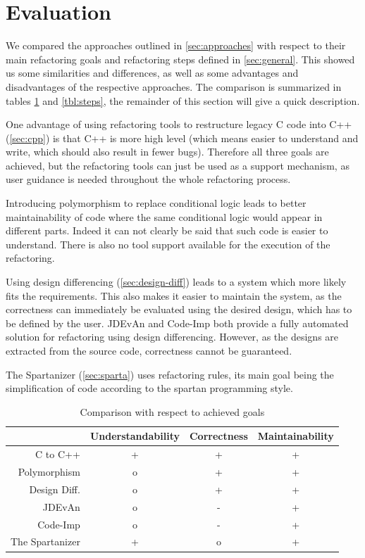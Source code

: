 \documentclass[conference,compsoc,a4paper]{IEEEtran}
\newcommand{\JDEvAn}{\mbox{JDEvAn}\xspace}
\begin{document}
\section{Evaluation}

We compared the approaches outlined in \autoref{sec:approaches} with respect to their main refactoring goals and 
refactoring steps defined in \autoref{sec:general}. This showed us some similarities and differences, as well as some 
advantages and disadvantages of the respective approaches. The comparison is summarized in tables \ref{tbl:goals} and 
\ref{tbl:steps}, the remainder of this section will give a quick description.

One advantage of using refactoring tools to restructure legacy C code into C++ (\autoref{sec:cpp}) is that C++ is more 
high level (which means easier to understand and write, which should also result in fewer bugs). Therefore all three 
goals are achieved, but the refactoring tools can just be used as a support mechanism, as user guidance is needed 
throughout the whole refactoring process.

Introducing polymorphism to replace conditional logic leads to better maintainability of code where the same 
conditional logic would appear in different parts. Indeed it can not clearly be said that such code is easier to 
understand. There is also no tool support available for the execution of the refactoring.

Using design differencing (\autoref{sec:design-diff}) leads to a system which more likely fits the requirements. This 
also makes it easier to maintain the system, as the correctness can immediately be evaluated using the desired design, 
which has to be defined by the user.
\JDEvAn and Code-Imp both provide a fully automated solution for 
refactoring using design differencing. However, as the designs are extracted from the source code, correctness cannot 
be guaranteed.

The Spartanizer (\autoref{sec:sparta}) uses refactoring rules, its main goal being the simplification of code according 
to the spartan programming style.

\begin{table}[htb]
  \centering
  \caption{Comparison with respect to achieved goals}
  \label{tbl:goals}
  \begin{tabular}{r|ccc}
    ~               & Understandability & Correctness & Maintainability \\ \hline
    C to C++        & +                 & +           & + \\
    Polymorphism    & o                 & +           & + \\
    Design Diff.    & o                 & +           & + \\
    JDEvAn          & o                 & -           & + \\
    Code-Imp        & o                 & -           & + \\
    The Spartanizer & +                 & o           & + \\
  \end{tabular}
\end{table}
\end{document}
